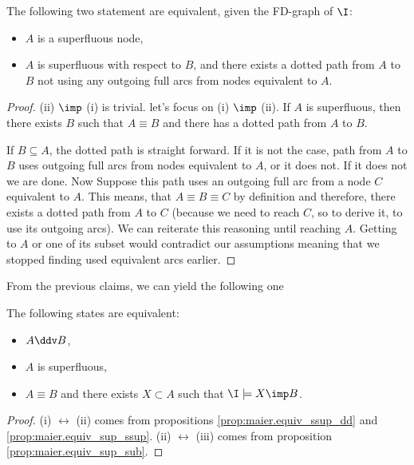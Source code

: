 \begin{proposition} \label{prop:maier.equiv_sup_ssup}
The following two statement are equivalent, given the FD-graph of $\I$:
\begin{itemize}
	\item[(i)] $A$ is a superfluous node,
	\item[(ii)] $A$ is superfluous with respect to $B$, and there exists a
	dotted path from $A$ to $B$ not using any outgoing full arcs from nodes
	equivalent to $A$.
\end{itemize}
	
\end{proposition}

\begin{proof} (ii) $\imp$ (i) is trivial. let's focus on (i) $\imp$ (ii). If 
$A$ is superfluous, then there exists $B$ such that $A \equiv B$ and there 
has a dotted path from $A$ to $B$.

\vspace{1.2em}

If $B \subseteq A$, the dotted path is straight forward. If it is not the 
case, path from $A$ to $B$ uses outgoing full arcs from nodes equivalent to 
$A$, or it does not. If it does not we are done. Now Suppose this
path uses an outgoing full arc from a node $C$ equivalent to $A$. This 
means, that $A \equiv B \equiv C$ by definition and therefore, there exists a
dotted path from $A$ to $C$ (because we need to reach $C$, so to derive it,
to use its outgoing arcs). We can reiterate this reasoning until reaching 
$A$. Getting to $A$ or one of its subset would contradict our assumptions 
meaning that we stopped finding used equivalent arcs earlier.
	
\end{proof}

From the previous claims, we can yield the following one

\begin{proposition} \label{prop:maier.equiv_sup_dd_sub}
The following states are equivalent:
\begin{itemize}
	\item[(i)] $A \ddv B$,
	\item[(ii)] $A$ is superfluous,
	\item[(iii)] $A \equiv B$ and there exists $X \subset A$ such that $\I 
	\models X \imp B$.
\end{itemize}
\end{proposition}

\begin{proof} (i) $\longleftrightarrow$ (ii) comes from propositions 
\ref{prop:maier.equiv_ssup_dd} and \ref{prop:maier.equiv_sup_ssup}. (ii) 
$\longleftrightarrow$ (iii) comes from proposition 
\ref{prop:maier.equiv_sup_sub}.
	
\end{proof}

